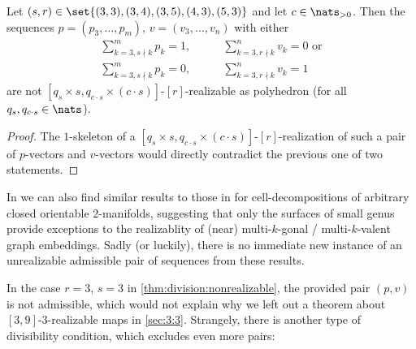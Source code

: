 \begin{corollary}\label{thm:division:nonrealizable}
  Let $(s, r) \in \set{(3, 3), (3, 4), (3, 5), (4, 3), (5, 3)}$ and let $c \in \nats_{> 0}$. Then the sequences $p = (p_3, \dots, p_m)$, $v = (v_3, \dots, v_n)$ with either
  \begin{align*}
    \sum_{k = 3, s \nmid k}^m p_k = 1, \qquad&\sum_{k = 3, r \nmid k}^n v_k = 0 \text{~or} \\
    \sum_{k = 3, s \nmid k}^m p_k = 0, \qquad&\sum_{k = 3, r \nmid k}^n v_k = 1
  \end{align*}
  are not $[q_s \times s, q_{c \cdot s} \times (c \cdot s)]$-$[r]$-realizable as polyhedron (for all $q_s, q_{c \cdot s} \in \nats$).
\begin{proof}
  The $1$-skeleton of a $[q_s \times s, q_{c \cdot s} \times (c \cdot s)]$-$[r]$-realization of such a pair of $p$-vectors and $v$-vectors would directly contradict the previous one of two statements.
\end{proof}
\end{corollary}

In \cite{horvnak1977nearly} we can also find similar results to those in \cite{malkevitch1970properties} for cell-decompositions of arbitrary closed orientable $2$-manifolds, suggesting that only the surfaces of small genus provide exceptions to the realizablity of (near) multi-$k$-gonal / multi-$k$-valent graph embeddings. Sadly (or luckily), there is no immediate new instance of an unrealizable admissible pair of sequences from these results.

In the case $r = 3$, $s = 3$ in \autoref{thm:division:nonrealizable}, the provided pair $(p, v)$ is not admissible, which would not explain why we left out a theorem about $[3, 9]$-$3$-realizable maps in \autoref{sec:3:3}. Strangely, there is another type of divisibility condition, which excludes even more pairs:

